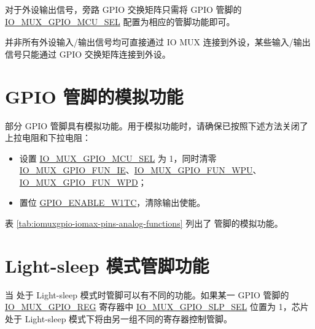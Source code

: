 \documentclass[main\_\_CN.tex]{subfiles}
\begin{document}
对于外设输出信号，旁路 GPIO 交换矩阵只需将 GPIO 管脚的 \hyperref[fielddesc:IOMUXGPIONMCUSEL]{IO\_MUX\_GPIO\_MCU\_SEL} 配置为相应的管脚功能即可。

\begin{tiplisting}
并非所有外设输入/输出信号均可直接通过 IO MUX 连接到外设，某些输入/输出信号只能通过 GPIO 交换矩阵连接到外设。
\end{tiplisting}

\section{GPIO 管脚的模拟功能}

\chipname{} 部分 GPIO 管脚具有模拟功能。用于模拟功能时，请确保已按照下述方法关闭了上拉电阻和下拉电阻：

\begin{itemize}
    \item 设置 \hyperref[fielddesc:IOMUXGPIONMCUSEL]{IO\_MUX\_GPIO\_MCU\_SEL} 为 1，同时清零 \hyperref[fielddesc:IOMUXGPIONFUNIE]{IO\_MUX\_GPIO\_FUN\_IE}、\hyperref[fielddesc:IOMUXGPIONFUNWPU]{IO\_MUX\_GPIO\_FUN\_WPU}、\hyperref[fielddesc:IOMUXGPIONFUNWPD]{IO\_MUX\_GPIO\_FUN\_WPD}；
    \item 置位 \hyperref[fielddesc:GPIOENABLEW1TC]{GPIO\_ENABLE\_W1TC\regindex{[n]}}，清除输出使能。
\end{itemize}
表 \ref{tab:iomuxgpio-iomax-pins-analog-functions} 列出了 \chipname{} 管脚的模拟功能。

\section{Light-sleep 模式管脚功能}\label{sec:iomuxgpio-pin-func-light-sleep}

当 \chipname{} 处于 Light-sleep 模式时管脚可以有不同的功能。如果某一 GPIO 管脚的 \hyperref[regdesc:IOMUXGPIONREG]{IO\_MUX\_GPIO\_REG} 寄存器中 \hyperref[fielddesc:IOMUXGPIONSLPSEL]{IO\_MUX\_GPIO\_SLP\_SEL} 位置为 1，芯片处于 Light-sleep 模式下将由另一组不同的寄存器控制管脚。
\end{document}
